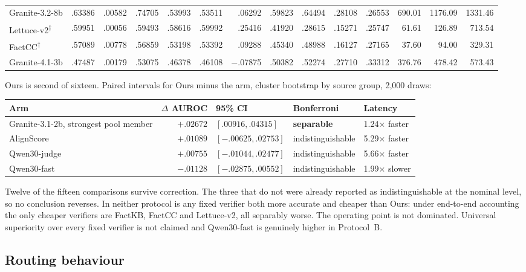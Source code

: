 \documentclass[10pt,a4paper]{article}
\newcommand{\ours}{\textsuperscript{$\dagger$}}
\begin{document}
\begin{center}
{\begin{tabular}{lrrrrrrrrrrrrr}
Granite-3.2-8b & .63386 & .00582 & .74705 & .53993 & .53511 & .06292 & .59823 & .64494 & .28108 & .26553 & 690.01 & 1176.09 & 1331.46 \\
Lettuce-v2\ours & .59951 & .00056 & .59493 & .58616 & .59992 & .25416 & .41920 & .28615 & .15271 & .25747 & 61.61 & 126.89 & 713.54 \\
FactCC\ours & .57089 & .00778 & .56859 & .53198 & .53392 & .09288 & .45340 & .48988 & .16127 & .27165 & 37.60 & 94.00 & 329.31 \\
Granite-4.1-3b & .47487 & .00179 & .53075 & .46378 & .46108 & $-$.07875 & .50382 & .52274 & .27710 & .33312 & 376.76 & 478.42 & 573.43 \\
\bottomrule
\end{tabular}}
\end{center}

Ours is second of sixteen. Paired intervals for Ours minus the arm, cluster bootstrap by source
group, 2{,}000 draws:

\begin{center}\small
\begin{tabular}{lrlll}
\toprule
Arm & $\Delta$ AUROC & 95\% CI & Bonferroni & Latency \\
\midrule
Granite-3.1-2b, strongest pool member & $+.02672$ & $[.00916,.04315]$ & \textbf{separable} & 1.24$\times$ faster \\
AlignScore & $+.01089$ & $[-.00625,.02753]$ & indistinguishable & 5.29$\times$ faster \\
Qwen30-judge & $+.00755$ & $[-.01044,.02477]$ & indistinguishable & 5.66$\times$ faster \\
Qwen30-fast & $-.01128$ & $[-.02875,.00552]$ & indistinguishable & 1.99$\times$ slower \\
\bottomrule
\end{tabular}
\end{center}

Twelve of the fifteen comparisons survive correction. The three that do not were already reported
as indistinguishable at the nominal level, so no conclusion reverses. In neither protocol is any
fixed verifier both more accurate and cheaper than Ours: under end-to-end accounting the only
cheaper verifiers are FactKB, FactCC and Lettuce-v2, all separably worse. The operating point is
not dominated. Universal superiority over every fixed verifier is not claimed and Qwen30-fast is
genuinely higher in Protocol~B.

\subsection{Routing behaviour}
\end{document}

